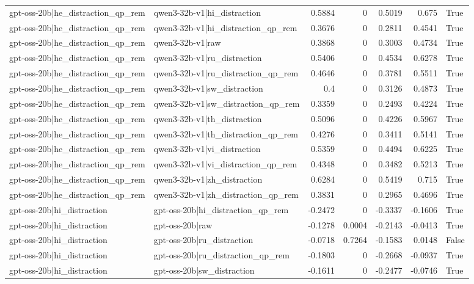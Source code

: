 \begin{table}
\begin{tabular}{l l r r r r l}
gpt-oss-20b|he_distraction_qp_rem & qwen3-32b-v1|hi_distraction & 0.5884 & 0 & 0.5019 & 0.675 & True \\
gpt-oss-20b|he_distraction_qp_rem & qwen3-32b-v1|hi_distraction_qp_rem & 0.3676 & 0 & 0.2811 & 0.4541 & True \\
gpt-oss-20b|he_distraction_qp_rem & qwen3-32b-v1|raw & 0.3868 & 0 & 0.3003 & 0.4734 & True \\
gpt-oss-20b|he_distraction_qp_rem & qwen3-32b-v1|ru_distraction & 0.5406 & 0 & 0.4534 & 0.6278 & True \\
gpt-oss-20b|he_distraction_qp_rem & qwen3-32b-v1|ru_distraction_qp_rem & 0.4646 & 0 & 0.3781 & 0.5511 & True \\
gpt-oss-20b|he_distraction_qp_rem & qwen3-32b-v1|sw_distraction & 0.4 & 0 & 0.3126 & 0.4873 & True \\
gpt-oss-20b|he_distraction_qp_rem & qwen3-32b-v1|sw_distraction_qp_rem & 0.3359 & 0 & 0.2493 & 0.4224 & True \\
gpt-oss-20b|he_distraction_qp_rem & qwen3-32b-v1|th_distraction & 0.5096 & 0 & 0.4226 & 0.5967 & True \\
gpt-oss-20b|he_distraction_qp_rem & qwen3-32b-v1|th_distraction_qp_rem & 0.4276 & 0 & 0.3411 & 0.5141 & True \\
gpt-oss-20b|he_distraction_qp_rem & qwen3-32b-v1|vi_distraction & 0.5359 & 0 & 0.4494 & 0.6225 & True \\
gpt-oss-20b|he_distraction_qp_rem & qwen3-32b-v1|vi_distraction_qp_rem & 0.4348 & 0 & 0.3482 & 0.5213 & True \\
gpt-oss-20b|he_distraction_qp_rem & qwen3-32b-v1|zh_distraction & 0.6284 & 0 & 0.5419 & 0.715 & True \\
gpt-oss-20b|he_distraction_qp_rem & qwen3-32b-v1|zh_distraction_qp_rem & 0.3831 & 0 & 0.2965 & 0.4696 & True \\
gpt-oss-20b|hi_distraction & gpt-oss-20b|hi_distraction_qp_rem & -0.2472 & 0 & -0.3337 & -0.1606 & True \\
gpt-oss-20b|hi_distraction & gpt-oss-20b|raw & -0.1278 & 0.0004 & -0.2143 & -0.0413 & True \\
gpt-oss-20b|hi_distraction & gpt-oss-20b|ru_distraction & -0.0718 & 0.7264 & -0.1583 & 0.0148 & False \\
gpt-oss-20b|hi_distraction & gpt-oss-20b|ru_distraction_qp_rem & -0.1803 & 0 & -0.2668 & -0.0937 & True \\
gpt-oss-20b|hi_distraction & gpt-oss-20b|sw_distraction & -0.1611 & 0 & -0.2477 & -0.0746 & True \\

\end{tabular}
\end{table}
